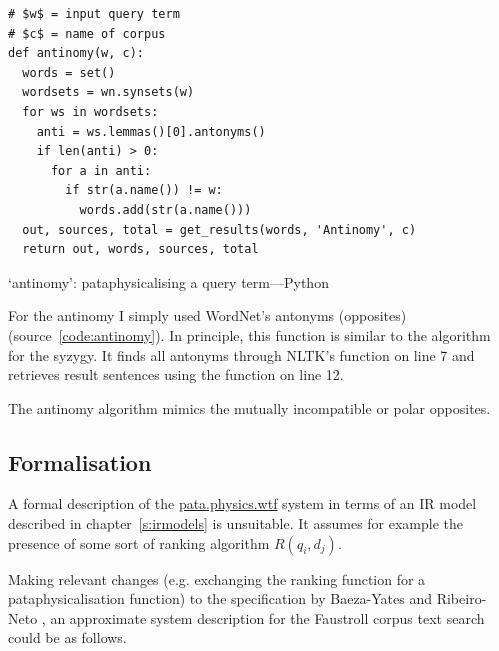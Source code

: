 \begin{listing}[!htbp] %
  \begin{verbatim}
# $w$ = input query term
# $c$ = name of corpus
def antinomy(w, c):
  words = set()
  wordsets = wn.synsets(w)
  for ws in wordsets:
    anti = ws.lemmas()[0].antonyms()
    if len(anti) > 0:
      for a in anti:
        if str(a.name()) != w:
          words.add(str(a.name()))
  out, sources, total = get_results(words, 'Antinomy', c)
  return out, words, sources, total
  \end{verbatim}
\caption[`antinomy' function---Python]{`antinomy': pataphysicalising a query term---Python}
\label{code:antinomy}
\end{listing}

For the antinomy I simply used WordNet's antonyms (opposites) (source~\ref{code:antinomy}). In principle, this function is similar to the algorithm for the syzygy. It finds all antonyms through \ac{NLTK}'s  function on line 7 and retrieves result sentences using the  function on line 12.

The antinomy algorithm mimics the mutually incompatible or polar opposites.


\subsection{Formalisation}
\label{s:formalisation}

A formal description of the \url{pata.physics.wtf} system in terms of an \ac{IR} model described in chapter~\ref{s:irmodels} is unsuitable. It assumes for example the presence of some sort of ranking algorithm $R(q_i, d_j)$.

Making relevant changes (e.g. exchanging the ranking function for a pataphysicalisation function) to the specification by Baeza-Yates and Ribeiro-Neto \autocite*{Baeza-Yates2011}, an approximate system description for the Faustroll corpus text search could be as follows.

